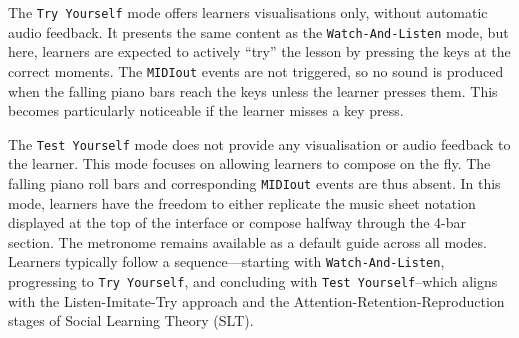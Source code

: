 \documentclass{vgtc}                          %
\begin{document}
The \texttt{Try Yourself} mode offers learners visualisations only, without automatic audio feedback. It presents the same content as the \texttt{Watch-And-Listen} mode, but here, learners are expected to actively ``try'' the lesson by pressing the keys at the correct moments. The \texttt{MIDIout} events are not triggered, so no sound is produced when the falling piano bars reach the keys unless the learner presses them. This becomes particularly noticeable if the learner misses a key press. %

\par The \texttt{Test Yourself} mode does not provide any visualisation or audio feedback to the learner. %
This mode focuses on allowing learners to compose on the fly. The falling piano roll bars and corresponding \texttt{MIDIout} events are thus absent. In this mode, learners have the freedom to either replicate the music sheet notation displayed at the top of the interface or compose halfway through the 4-bar section. The metronome remains available as a default guide across all modes. Learners typically follow a sequence—starting with \texttt{Watch-And-Listen}, progressing to \texttt{Try Yourself}, and concluding with \texttt{Test Yourself}--which aligns with the Listen-Imitate-Try approach and the Attention-Retention-Reproduction stages of Social Learning Theory (SLT). %
\end{document}
